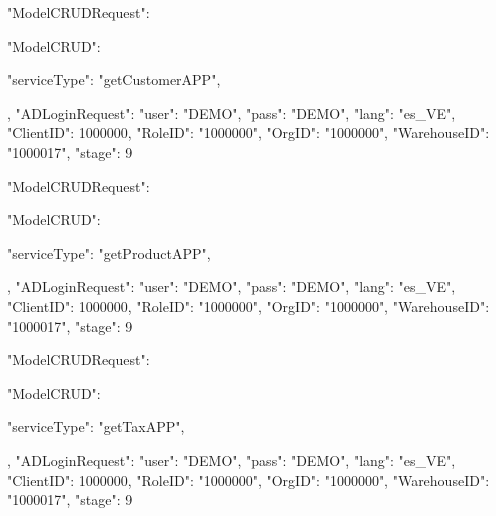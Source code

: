 {
    "ModelCRUDRequest": {
        "ModelCRUD": {
            "serviceType": "getCustomerAPP",
           
        },
        "ADLoginRequest": {
            "user": "DEMO",
            "pass": "DEMO",
            "lang": "es_VE",
            "ClientID": 1000000,
            "RoleID": "1000000",
            "OrgID": "1000000",
            "WarehouseID": "1000017",
            "stage": 9
        }
    }
}





{
    "ModelCRUDRequest": {
        "ModelCRUD": {
            "serviceType": "getProductAPP",
           
        },
        "ADLoginRequest": {
            "user": "DEMO",
            "pass": "DEMO",
            "lang": "es_VE",
            "ClientID": 1000000,
            "RoleID": "1000000",
            "OrgID": "1000000",
            "WarehouseID": "1000017",
            "stage": 9
        }
    }
}




{
    "ModelCRUDRequest": {
        "ModelCRUD": {
            "serviceType": "getTaxAPP",
           
        },
        "ADLoginRequest": {
            "user": "DEMO",
            "pass": "DEMO",
            "lang": "es_VE",
            "ClientID": 1000000,
            "RoleID": "1000000",
            "OrgID": "1000000",
            "WarehouseID": "1000017",
            "stage": 9
        }
    }
}





